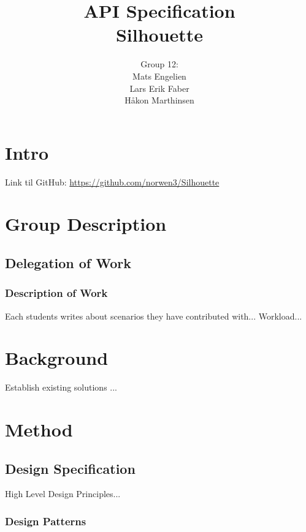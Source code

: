 \documentclass[12pt]{article}
\begin{document}
\title{%
    API Specification\\
    \large Silhouette}
\author{%
    Group 12:\\
    Mats Engelien\\
    Lars Erik Faber\\
    Håkon Marthinsen}
\date{}
\maketitle

\newpage

\tableofcontents

\newpage

\section{Intro}

Link til GitHub: \href{https://github.com/norwen3/Silhouette}{https://github.com/norwen3/Silhouette}

\section{Group Description}

    \subsection{Delegation of Work}

    \subsubsection{Description of Work}
    Each students writes about scenarios they have contributed with...
    Workload...

\section{Background}
Establish existing solutions ...

\section{Method}

    \subsection{Design Specification}
    High Level Design Principles...

\subsubsection{Design Patterns}
\end{document}
